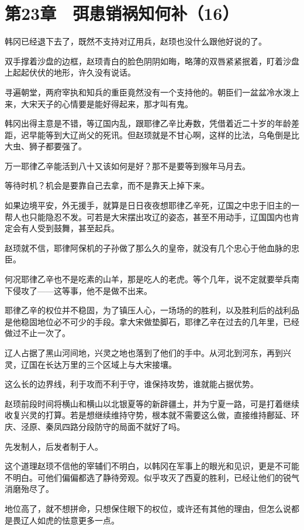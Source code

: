 \section{第23章　弭患销祸知何补（16）}

韩冈已经退下去了，既然不支持对辽用兵，赵顼也没什么跟他好说的了。

双手撑着沙盘的边框，赵顼青白的脸色阴阴如晦，略薄的双唇紧紧抿着，盯着沙盘上起起伏伏的地形，许久没有说话。

寻遍朝堂，两府宰执和知兵的重臣竟然没有一个支持他的。朝臣们一盆盆冷水泼上来，大宋天子的心情要是能好得起来，那才叫有鬼。

韩冈出得主意是不错，等辽国内乱，跟耶律乙辛比寿数，凭借着近二十岁的年龄差距，迟早能等到大辽尚父的死讯。但赵顼就是不甘心啊，这样的比法，乌龟倒是比大虫、狮子都要强了。

万一耶律乙辛能活到八十又该如何是好？那不是要等到猴年马月去。

等待时机？机会是要靠自己去拿，而不是靠天上掉下来。

如果边境平安，外无援手，就算是日日夜夜想耶律乙辛死，辽国之中忠于旧主的一帮人也只能隐忍不发。可若是大宋摆出攻辽的姿态，甚至不用动手，辽国国内也肯定会有人受到鼓舞，甚至起兵。

赵顼就不信，耶律阿保机的子孙做了那么久的皇帝，就没有几个忠心于他血脉的忠臣。

何况耶律乙辛也不是吃素的山羊，那是吃人的老虎。等个几年，说不定就要举兵南下侵攻了——这等事，他不是做不出来。

耶律乙辛的权位并不稳固，为了镇压人心，一场场的的胜利，以及胜利后的战利品是他稳固地位必不可少的手段。拿大宋做垫脚石，耶律乙辛在过去的几年里，已经做过不止一次了。

辽人占据了黑山河间地，兴灵之地也落到了他们的手中。从河北到河东，再到兴灵，辽国在长达万里的三个区域上与大宋接壤。

这么长的边界线，利于攻而不利于守，谁保持攻势，谁就能占据优势。

赵顼前段时间将横山和横山以北银夏等的新辟疆土，并为宁夏一路，可是打着继续收复兴灵的打算。若是想继续维持守势，根本就不需要这么做，直接维持鄜延、环庆、泾原、秦凤四路分段防守的局面不就好了吗。

先发制人，后发者制于人。

这个道理赵顼不信他的宰辅们不明白，以韩冈在军事上的眼光和见识，更是不可能不明白。可他们偏偏都选了静待旁观。似乎攻灭了西夏的胜利，已经让他们的锐气消磨殆尽了。

地位高了，就不想拼命，只想保住眼下的权位，或许还有其他的理由，但怎么说都是畏辽人如虎的怯意更多一点。

